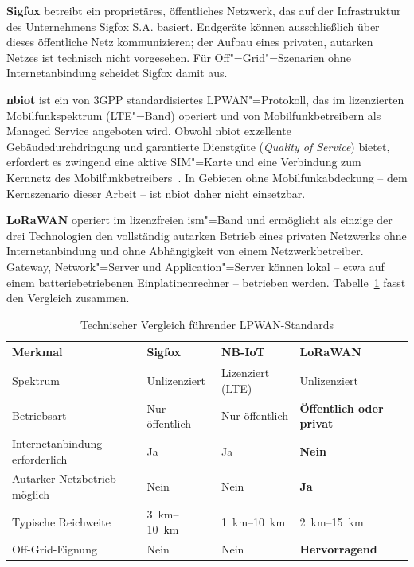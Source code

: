 \textbf{Sigfox} betreibt ein proprietäres, öffentliches Netzwerk, das auf
der Infrastruktur des Unternehmens Sigfox S.A. basiert. Endgeräte können
ausschließlich über dieses öffentliche Netz kommunizieren; der Aufbau eines
privaten, autarken Netzes ist technisch nicht vorgesehen. Für
Off"=Grid"=Szenarien ohne Internetanbindung scheidet Sigfox damit aus.

\textbf{\acrshort{nbiot}} ist ein von 3GPP standardisiertes LPWAN"=Protokoll,
das im lizenzierten Mobilfunkspektrum (LTE"=Band) operiert und von
Mobilfunkbetreibern als Managed Service angeboten wird. Obwohl \acrshort{nbiot}
exzellente Gebäudedurchdringung und garantierte Dienstgüte (\textit{Quality
of Service}) bietet, erfordert es zwingend eine aktive SIM"=Karte und eine
Verbindung zum Kernnetz des Mobilfunkbetreibers~\cite{mekki2019comparative}.
In Gebieten ohne Mobilfunkabdeckung -- dem Kernszenario dieser Arbeit -- ist
\acrshort{nbiot} daher nicht einsetzbar.

\textbf{LoRaWAN} operiert im lizenzfreien \acrshort{ism}"=Band und ermöglicht als
einzige der drei Technologien den vollständig autarken Betrieb eines privaten
Netzwerks ohne Internetanbindung und ohne Abhängigkeit von einem
Netzwerkbetreiber. Gateway, Network"=Server und Application"=Server können
lokal -- etwa auf einem batteriebetriebenen Einplatinenrechner -- betrieben
werden. Tabelle~\ref{tab:lpwan_vergleich} fasst den Vergleich zusammen.

\begin{table}[htbp]
    \centering
    \caption{Technischer Vergleich führender LPWAN-Standards}
    \label{tab:lpwan_vergleich}
    \begin{tabularx}{\textwidth}{l X X X}
        \toprule
        \textbf{Merkmal} & \textbf{Sigfox} & \textbf{NB-IoT} & \textbf{LoRaWAN} \\
        \midrule
        Spektrum
            & Unlizenziert
            & Lizenziert (LTE)
            & Unlizenziert \\
        \addlinespace
        Betriebsart
            & Nur öffentlich
            & Nur öffentlich
            & \textbf{Öffentlich oder privat} \\
        \addlinespace
        Internetanbindung erforderlich
            & Ja
            & Ja
            & \textbf{Nein} \\
        \addlinespace
        Autarker Netzbetrieb möglich
            & Nein
            & Nein
            & \textbf{Ja} \\
        \addlinespace
        Typische Reichweite
            & \SIrange{3}{10}{\km}
            & \SIrange{1}{10}{\km}
            & \SIrange{2}{15}{\km} \\
        \addlinespace
        Off-Grid-Eignung
            & Nein
            & Nein
            & \textbf{Hervorragend} \\
        \bottomrule
    \end{tabularx}
\end{table}

